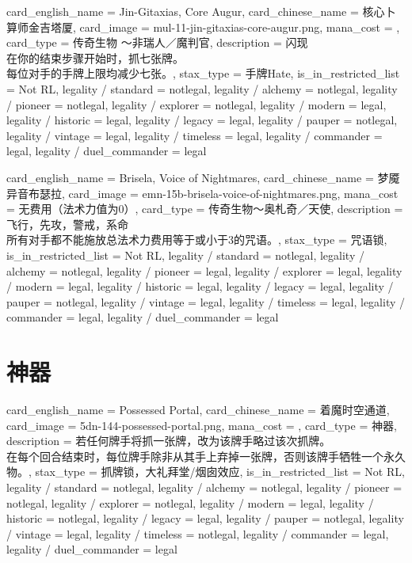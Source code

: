 \documentclass[lang = cn, color = black, 10pt]{AllThatStax}
\begin{document}
\card
{
	card_english_name = {Jin-Gitaxias, Core Augur},
	card_chinese_name = {核心卜算师金吉塔厦},
	card_image = mul-11-jin-gitaxias-core-augur.png,
	mana_cost = ,
	card_type = 传奇生物 ～非瑞人／魔判官,
	description = {闪现\\
		在你的结束步骤开始时，抓七张牌。\\
		每位对手的手牌上限均减少七张。},
	stax_type = 手牌Hate,
	is_in_restricted_list = Not RL,
	legality / standard = notlegal,
	legality / alchemy = notlegal,
	legality / pioneer = notlegal,
	legality / explorer = notlegal,
	legality / modern = legal,
	legality / historic = legal,
	legality / legacy = legal,
	legality / pauper = notlegal,
	legality / vintage = legal,
	legality / timeless = legal,
	legality / commander = legal,
	legality / duel_commander = legal
}

\card
{
	card_english_name = {Brisela, Voice of Nightmares},
	card_chinese_name = {梦魇异音布瑟拉},
	card_image = emn-15b-brisela-voice-of-nightmares.png,
	mana_cost = 无费用（法术力值为0）,
	card_type = 传奇生物～奥札奇／天使,
	description = {飞行，先攻，警戒，系命\\
		所有对手都不能施放总法术力费用等于或小于3的咒语。},
	stax_type = 咒语锁,
	is_in_restricted_list = Not RL,
	legality / standard = notlegal,
	legality / alchemy = notlegal,
	legality / pioneer = legal,
	legality / explorer = legal,
	legality / modern = legal,
	legality / historic = legal,
	legality / legacy = legal,
	legality / pauper = notlegal,
	legality / vintage = legal,
	legality / timeless = legal,
	legality / commander = legal,
	legality / duel_commander = legal
}

\section{神器}

\card
{
	card_english_name = {Possessed Portal},
	card_chinese_name = {着魔时空通道},
	card_image = 5dn-144-possessed-portal.png,
	mana_cost = ,
	card_type = 神器,
	description = {若任何牌手将抓一张牌，改为该牌手略过该次抓牌。\\
		在每个回合结束时，每位牌手除非从其手上弃掉一张牌，否则该牌手牺牲一个永久物。},
	stax_type = 抓牌锁，大礼拜堂/烟囱效应,
	is_in_restricted_list = Not RL,
	legality / standard = notlegal,
	legality / alchemy = notlegal,
	legality / pioneer = notlegal,
	legality / explorer = notlegal,
	legality / modern = legal,
	legality / historic = notlegal,
	legality / legacy = legal,
	legality / pauper = notlegal,
	legality / vintage = legal,
	legality / timeless = notlegal,
	legality / commander = legal,
	legality / duel_commander = legal
}
\end{document}
